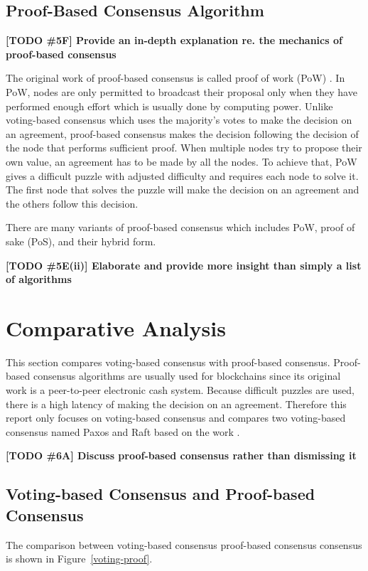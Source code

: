 \documentclass[12pt, a4paper]{article}
\newcommand{\todo}[2]{\textbf{\color{blue}[TODO \##1] #2}\par}
\begin{document}
\subsection{Proof-Based Consensus Algorithm}
\todo{5F}{Provide an in-depth explanation re. the mechanics of proof-based consensus}
The original work of proof-based consensus is called proof of work (PoW) \cite{nakamoto2019bitcoin}. In PoW, nodes are only permitted to broadcast their proposal only when they have performed enough effort which is usually done by computing power. Unlike voting-based consensus which uses the majority's votes to make the decision on an agreement, proof-based consensus makes the decision following the decision of the node that performs sufficient proof. When multiple nodes try to propose their own value, an agreement has to be made by all the nodes. To achieve that, PoW gives a difficult puzzle with adjusted difficulty and requires each node to solve it. The first node that solves the puzzle will make the decision on an agreement and the others follow this decision.

There are many variants of proof-based consensus which includes PoW, proof of sake (PoS), and their hybrid form.

\todo{5E(ii)}{Elaborate and provide more insight than simply a list of algorithms}


\section{Comparative Analysis}
\label{sec:comparitive}

This section compares voting-based consensus with proof-based consensus. Proof-based consensus algorithms are usually used for blockchains since its original work is a peer-to-peer electronic cash system. Because difficult puzzles are used, there is a high latency of making the decision on an agreement. Therefore this report only focuses on voting-based consensus and compares two voting-based consensus named Paxos and Raft based on the work \cite{howard2020paxos}.

\todo{6A}{Discuss proof-based consensus rather than dismissing it}

\subsection{Voting-based Consensus and Proof-based Consensus}
The comparison between voting-based consensus proof-based consensus consensus is shown in Figure~\ref{voting-proof}.
\end{document}
